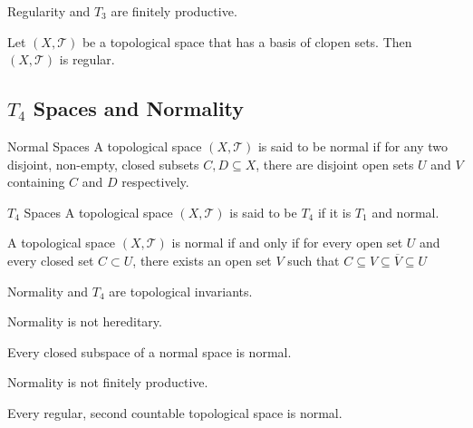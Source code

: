 \begin{prp}{}{} Regularity and $T_3$ are finitely productive. 
\end{prp}

\begin{prp}{}{} Let $(X,\mathcal{T})$ be a topological space that has a basis of clopen sets. Then $(X,\mathcal{T})$ is regular. 
\end{prp}

\subsection{$T_4$ Spaces and Normality}
\begin{defn}{Normal Spaces}{} A topological space $(X,\mathcal{T})$ is said to be normal if for any two disjoint, non-empty, closed subsets $C,D\subseteq X$, there are disjoint open sets $U$ and $V$ containing $C$ and $D$ respectively. 
\end{defn}

\begin{defn}{$T_4$ Spaces}{} A topological space $(X,\mathcal{T})$ is said to be $T_4$ if it is $T_1$ and normal. 
\end{defn}

\begin{prp}{}{}  A topological space $(X,\mathcal{T})$ is normal if and only if for every open set $U$ and every closed set $C\subset U$, there exists an open set $V$ such that $C\subseteq V\subseteq\overline{V}\subseteq U$
\end{prp}

\begin{prp}{}{} Normality and $T_4$ are topological invariants. 
\end{prp}

\begin{prp}{}{} Normality is not hereditary. 
\end{prp}

\begin{prp}{}{} Every closed subspace of a normal space is normal. 
\end{prp}

\begin{prp}{}{} Normality is not finitely productive. 
\end{prp}

\begin{thm}{}{} Every regular, second countable topological space is normal. 
\end{thm}

\pagebreak
